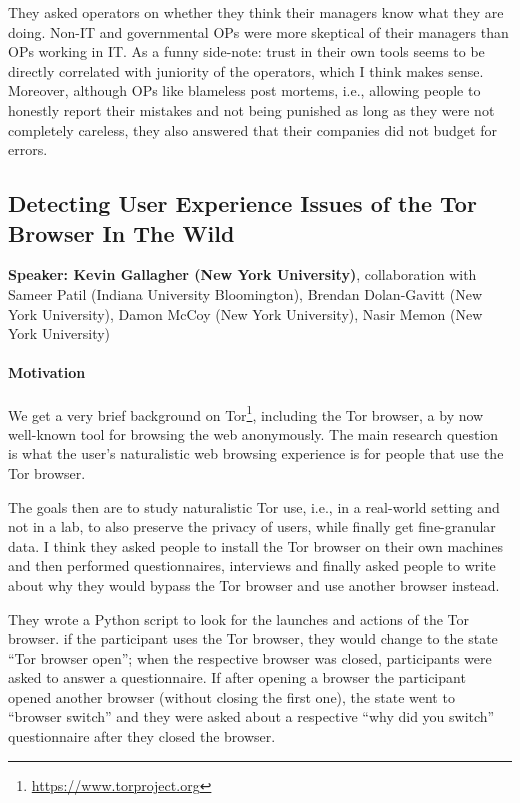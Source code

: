 \documentclass{article}
\begin{document}
They asked operators on whether they think their managers know what they are doing. Non-IT and governmental OPs were more skeptical of their managers than OPs working in IT. As a funny side-note: trust in their own tools seems to be directly correlated with juniority of the operators, which I think makes sense. Moreover, although OPs like blameless post mortems, i.e., allowing people to honestly report their mistakes and not being punished as long as they were not completely careless, they also answered that their companies did not budget for errors.

\subsection{Detecting User Experience Issues of the Tor Browser In The Wild}
\noindent\textbf{Speaker: Kevin Gallagher (New York University)}, collaboration with Sameer Patil (Indiana University Bloomington), Brendan Dolan-Gavitt (New York University), Damon McCoy (New York University), Nasir Memon (New York University)

\paragraph{Motivation} We get a very brief background on Tor\footnote{\url{https://www.torproject.org}}, including the Tor browser, a by now well-known tool for browsing the web anonymously. The main research question is what the user's naturalistic web browsing experience is for people that use the Tor browser.

The goals then are to study naturalistic Tor use, i.e., in a real-world setting and not in a lab, to also preserve the privacy of users, while finally get fine-granular data. I think they asked people to install the Tor browser on their own machines and then performed questionnaires, interviews and finally asked people to write about why they would bypass the Tor browser and use another browser instead.

They wrote a Python script to look for the launches and actions of the Tor browser. if the participant uses the Tor browser, they would change to the state ``Tor browser open''; when the respective browser was closed, participants were asked to answer a questionnaire. If after opening a browser the participant opened another browser (without closing the first one), the state went to ``browser switch'' and they were asked about a respective ``why did you switch'' questionnaire after they closed the browser.
\end{document}
